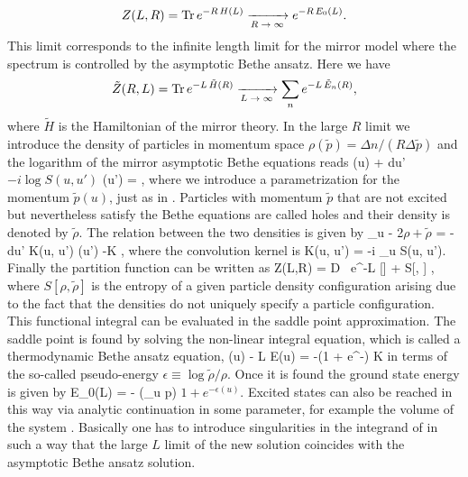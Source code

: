 \begin{equation}
	Z(L,R) = \mathrm{Tr} \, e^{-R \, H(L)} \xrightarrow[\text{$R \rightarrow \infty$}]{} e^{-R \, E_0(L)}.
\end{equation}
This limit corresponds to the infinite length limit for the mirror model where the spectrum is controlled by the asymptotic Bethe ansatz.
Here we have
\begin{equation}
	\tilde{Z}(R,L) = \mathrm{Tr} \, e^{-L \, \tilde{H}(R)} \xrightarrow[\text{$L \rightarrow \infty$}]{}  \sum_n e^{-L \, \tilde{E}_n(R)},
\end{equation}
where $\tilde{H}$ is the Hamiltonian of the mirror theory. 
In the large $R$ limit we introduce the density of particles in momentum space $\rho(\tilde{p}) = \Delta n / (R \Delta \tilde p)$ and the logarithm of the mirror asymptotic Bethe equations reads
\beq
	(u) + \int du' \( -i \log S(u, u') \) \rho(u') = ,
\eeq
where we introduce a parametrization for the momentum $\tilde{p}(u)$, just as in . 
Particles with momentum $\tilde{p}$ that are not excited but nevertheless satisfy the Bethe equations are called holes and their density is denoted by $\tilde{\rho}$.
The relation between the two densities is given by
\beq
	\partial_u  - 2\pi \( \rho + \tilde \rho \) = - \int du' K(u, u') \rho(u') \equiv -K \star \rho,
\eeq
where the convolution kernel is
\beq
	K(u, u') = -i \partial_u \log S(u, u').
\eeq
Finally the partition function can be written as
\beq
	Z(L,R) = \int \mathcal D \rho \, e^{-L [\rho] + S[\rho, \tilde{\rho}] },
\eeq
where $S[\rho, \tilde{\rho}]$ is the entropy of a given particle density configuration arising due to the fact that the densities do not uniquely specify a particle configuration.
This functional integral can be evaluated in the saddle point approximation. 
The saddle point is found by solving the non-linear integral equation, which is called a thermodynamic Bethe ansatz equation,
\beq
	\label{eq:simple_tba}
	\epsilon(u) - L \tilde E(u) = -\log (1 + e^{-\epsilon}) \star K
\eeq
in terms of the so-called pseudo-energy $\epsilon \equiv \log \tilde{\rho} / \rho$. 
Once it is found the ground state energy is given by
\beq
	E_0(L) = - \int {} (\partial_u \tilde p) \log \(1 + e^{-\epsilon(u)}\).
\eeq
Excited states can also be reached in this way via analytic continuation in some parameter, for example the volume of the system \cite{Dorey:1996re}.
Basically one has to introduce singularities in the integrand of  in such a way that the large $L$ limit of the new solution coincides with the asymptotic Bethe ansatz solution.

